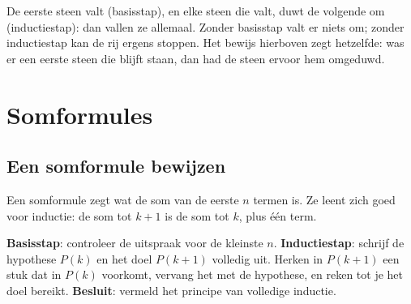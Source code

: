 De eerste steen valt (basisstap), en elke steen die valt, duwt de volgende om (inductiestap): dan vallen ze allemaal. Zonder basisstap valt er niets om; zonder inductiestap kan de rij ergens stoppen. Het bewijs hierboven zegt hetzelfde: was er een eerste steen die blijft staan, dan had de steen ervoor hem omgeduwd.

\begin{oefeningen}
\end{oefeningen}

\section{Somformules}\label{sec:h3-som}

\subsection{Een somformule bewijzen}

Een somformule zegt wat de som van de eerste $n$ termen is. Ze leent zich goed voor inductie: de som tot $k + 1$ is de som tot $k$, plus één term.


\begin{werkwijze}
\textbf{Basisstap}: controleer de uitspraak voor de kleinste $n$. \textbf{Inductiestap}: schrijf de hypothese $P(k)$ en het doel $P(k + 1)$ volledig uit. Herken in $P(k + 1)$ een stuk dat in $P(k)$ voorkomt, vervang het met de hypothese, en reken tot je het doel bereikt. \textbf{Besluit}: vermeld het principe van volledige inductie.
\end{werkwijze}

